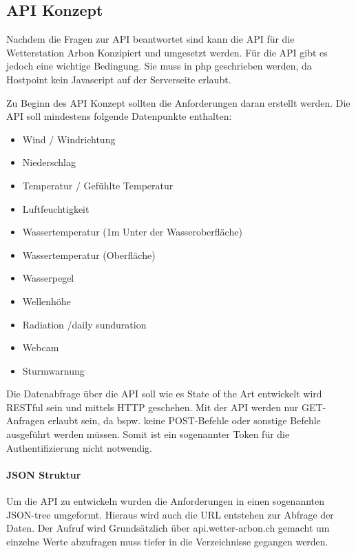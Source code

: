 \subsection{API Konzept}
Nachdem die Fragen zur API beantwortet sind kann die API für die Wetterstation Arbon Konzipiert und umgesetzt werden. Für die API gibt es jedoch eine wichtige Bedingung. Sie muss in php geschrieben werden, da Hostpoint kein Javascript auf der Serverseite erlaubt.

Zu Beginn des API Konzept sollten die Anforderungen daran erstellt werden. Die API soll mindestens folgende Datenpunkte enthalten:
\begin{itemize}
\item Wind / Windrichtung
\item Niederschlag
\item Temperatur / Gefühlte Temperatur
\item Luftfeuchtigkeit
\item Wassertemperatur (1m Unter der Wasseroberfläche)
\item Wassertemperatur (Oberfläche)
\item Wasserpegel
\item Wellenhöhe
\item Radiation /daily sunduration
\item Webcam
\item Sturmwarnung
\end{itemize}
Die Datenabfrage über die API soll wie es State of the Art entwickelt wird RESTful sein und mittels HTTP geschehen. Mit der API werden nur GET-Anfragen erlaubt sein, da bspw. keine POST-Befehle oder sonstige Befehle ausgeführt werden müssen. Somit ist ein sogenannter Token für die Authentifizierung nicht notwendig.

\paragraph{JSON Struktur}

Um die API zu entwickeln wurden die Anforderungen in einen sogenannten JSON-tree umgeformt. Hieraus wird auch die URL entstehen zur Abfrage der Daten. Der Aufruf wird Grundsätzlich über api.wetter-arbon.ch gemacht um einzelne Werte abzufragen muss tiefer in die Verzeichnisse gegangen werden.

